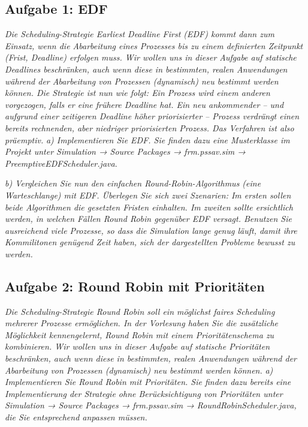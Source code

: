 \documentclass[a4paper]{article}
\begin{document}
\subsection{Aufgabe 1: EDF}
\textit{Die Scheduling-Strategie Earliest Deadline First (EDF) kommt dann zum Einsatz, wenn die Abarbeitung eines Prozesses bis zu einem definierten Zeitpunkt (Frist, Deadline) erfolgen muss. Wir wollen uns in dieser Aufgabe auf statische Deadlines beschränken, auch wenn diese in bestimmten, realen Anwendungen während der Abarbeitung von Prozessen (dynamisch) neu bestimmt werden können.
    Die Strategie ist nun wie folgt: Ein Prozess wird einem anderen vorgezogen, falls er eine frühere Deadline hat. Ein neu ankommender – und aufgrund einer zeitigeren Deadline höher priorisierter – Prozess verdrängt einen bereits rechnenden, aber niedriger priorisierten Prozess. Das Verfahren ist also präemptiv.}
\vspace{10mm}
\textit{a) Implementieren Sie EDF. Sie finden dazu eine Musterklasse im Projekt unter Simulation → Source Packages → frm.pssav.sim → PreemptiveEDFScheduler.java.}
\vspace{10mm}


\textit{b) Vergleichen Sie nun den einfachen Round-Robin-Algorithmus (eine Warteschlange) mit EDF. Überlegen Sie sich zwei Szenarien: Im ersten sollen beide Algorithmen die gesetzten Fristen einhalten. Im zweiten sollte ersichtlich werden, in welchen Fällen Round Robin gegenüber EDF versagt.
    Benutzen Sie ausreichend viele Prozesse, so dass die Simulation lange genug läuft, damit ihre Kommilitonen genügend Zeit haben, sich der dargestellten Probleme bewusst zu werden.}
\vspace{10mm}


\subsection{Aufgabe 2: Round Robin mit Prioritäten}
\textit{Die Scheduling-Strategie Round Robin soll ein möglichst faires Scheduling mehrerer Prozesse ermöglichen. In der Vorlesung haben Sie die zusätzliche Möglichkeit kennengelernt, Round Robin mit einem Prioritätenschema zu kombinieren. Wir wollen uns in dieser Aufgabe auf statische Prioritäten beschränken, auch wenn diese in bestimmten, realen Anwendungen während der Abarbeitung von Prozessen (dynamisch) neu bestimmt werden können.}
\vspace{10mm}
\textit{a) Implementieren Sie Round Robin mit Prioritäten. Sie finden dazu bereits eine Implementierung der Strategie ohne Berücksichtigung von Prioritäten unter Simulation → Source Packages → frm.pssav.sim → RoundRobinScheduler.java, die Sie entsprechend anpassen müssen.}
\vspace{10mm}
\end{document}
